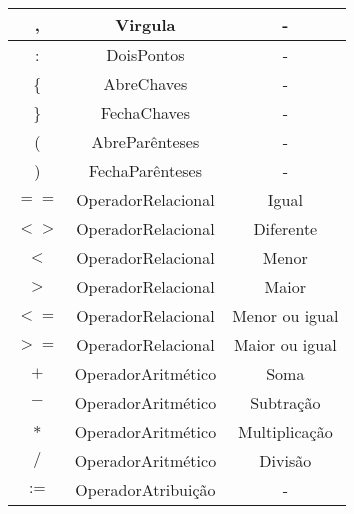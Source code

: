 \documentclass[11pt]{article}
\begin{document}
\begin{table}[H]
\begin{tabular}{c|c|c}
        \hline
         ,                 &        Virgula           &            -                \\
        \hline
         :                 &        DoisPontos        &            -                \\
        \hline
         \{                &        AbreChaves        &            -                \\
        \hline
         \}                &        FechaChaves       &            -                \\
        \hline
         (                 &        AbreParênteses    &            -                \\
        \hline
         )                 &        FechaParênteses   &            -                \\
        \hline
        \hline
         $==$              &      OperadorRelacional  &            Igual                     \\
        \hline
         $<>$              &      OperadorRelacional  &            Diferente                 \\
        \hline
         $<$               &      OperadorRelacional  &            Menor                     \\
        \hline
         $>$               &      OperadorRelacional  &            Maior                     \\
        \hline
         $<=$              &      OperadorRelacional  &            Menor ou igual            \\
        \hline
         $>=$              &      OperadorRelacional  &            Maior  ou igual           \\
        \hline
        \hline
         $+$               &      OperadorAritmético  &            Soma                      \\
        \hline
         $-$               &      OperadorAritmético  &            Subtração                 \\
        \hline
         $*$               &      OperadorAritmético  &            Multiplicação             \\
        \hline
         $/$               &      OperadorAritmético  &            Divisão                   \\
        \hline
        \hline
         $:=$              &      OperadorAtribuição  &            -                         \\
        \hline
       

        
    \end{tabular}
    

\end{table}
\end{document}
